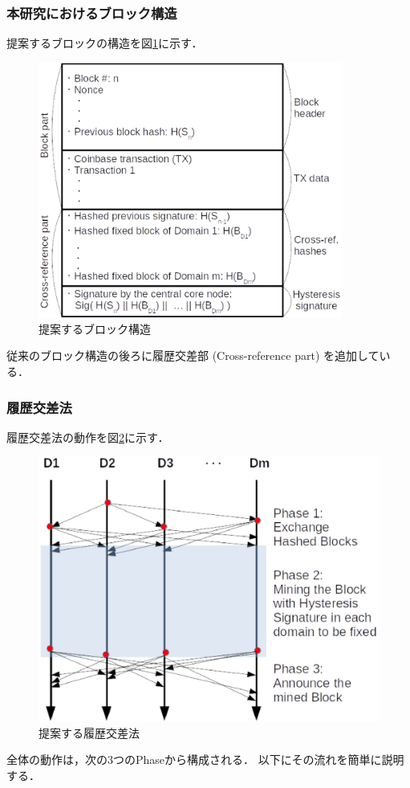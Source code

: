 \documentclass[a4paper,12pt]{jsarticle}
\begin{document}
      \subsubsection{本研究におけるブロック構造}
提案するブロックの構造を図\ref{fig:block}に示す．
%
\begin{figure}[H]%
  \begin{center}
    \includegraphics[width=100mm]{pht/block_structure.eps}
  \end{center}
  \caption{提案するブロック構造}
  \label{fig:block}
\end{figure}
%
従来のブロック構造の後ろに履歴交差部 (Cross-reference part) を追加している．

      \subsubsection{履歴交差法}
履歴交差法の動作を図\ref{fig:cross-ref}に示す．
%
\begin{figure}[H]%
  \begin{center}
    \includegraphics[width=120mm]{pht/time_sequence-algorithm1.eps}
  \end{center}
  \caption{提案する履歴交差法}
  \label{fig:cross-ref}
\end{figure}
%
全体の動作は，次の3つのPhaseから構成される．
以下にその流れを簡単に説明する．
\end{document}
